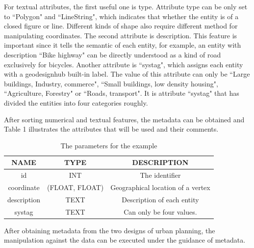 \par
For textual attributes, the first useful one is type. Attribute type can be only set to ``Polygon" and ``LineString", which indicates that whether the entity is of a closed figure or line. Different kinds of shape also require different method for manipulating coordinates. The second attribute is description. This feature is important since it tells the semantic of each entity, for example, an entity with description ``Bike highway" can be directly understood as a kind of road exclusively for bicycles. Another attribute is ``systag", which assigns each entity with a geodesignhub built-in label. The value of this attribute can only be ``Large buildings, Industry, commerce", ``Small buildings, low density housing", ``Agriculture, Forestry" or ``Roads, transport". It is attribute ``systag" that has divided the entities into four categories roughly. 
\par
After sorting numerical and textual features, the metadata can be obtained and Table 1 illustrates the attributes that will be used and their comments.
\begin{table}[H]
\centering
\caption{The parameters for the example}
\label{tab:my-table}
\begin{tabular}{|c|c|c|}
\hline
NAME & TYPE & DESCRIPTION \\ \hline
id & INT & The identifier \\ \hline
coordinate & (FLOAT, FLOAT) & Geographical location of a vertex \\ \hline
description & TEXT & Description of each entity \\ \hline
systag & TEXT & Can only be four values. \\ \hline
\end{tabular}
\end{table}
After obtaining metadata from the two designs of urban planning, the manipulation against the data can be executed under the guidance of metadata.

